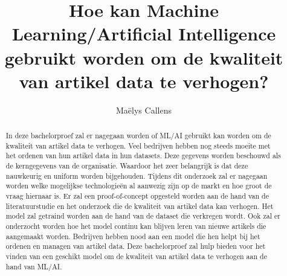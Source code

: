 \documentclass{hogent-article}
\title{Hoe kan Machine Learning/Artificial Intelligence gebruikt worden om de kwaliteit van artikel data te verhogen?}
\author{Maëlys Callens}
\begin{document}
\begin{abstract}
  In deze bachelorproef zal er nagegaan worden of ML/AI gebruikt kan worden om de kwaliteit van artikel data te verhogen. Veel bedrijven hebben nog steeds moeite met het ordenen van hun artikel data in hun datasets. Deze gegevens worden beschouwd als de kerngegevens van de organisatie. Waardoor het zeer belangrijk is dat deze nauwkeurig en uniform worden bijgehouden. Tijdens dit onderzoek zal er nagegaan worden welke mogelijkse technologieën al aanwezig zijn op de markt en hoe groot de vraag hiernaar is. Er zal een proof-of-concept opgesteld worden aan de hand van de literatuurstudie en het onderzoek die de kwaliteit van artikel data kan verhogen. Het model zal getraind worden aan de hand van de dataset die verkregen wordt. Ook zal er onderzocht worden hoe het model continu kan blijven leren van nieuwe artikels die aangemaakt worden. Bedrijven hebben nood aan een model die hen helpt bij het ordenen en managen van artikel data. Deze bachelorproef zal hulp bieden voor het vinden van een geschikt model om de kwaliteit van artikel data te verhogen aan de hand van ML/AI.
\end{abstract}

\tableofcontents



\printbibliography[heading=bibintoc]
\end{document}
